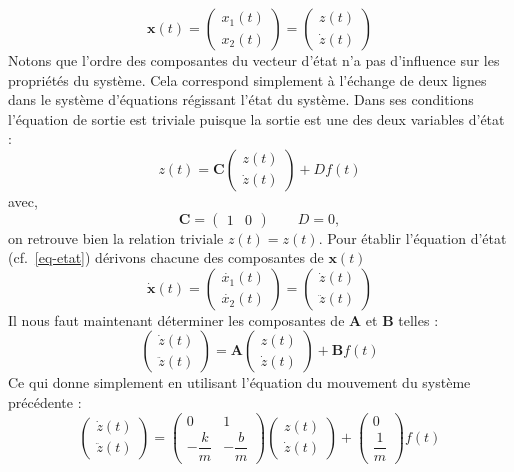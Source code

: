 \[
    \boldsymbol{x}(t)=
    \begin{pmatrix} x_1(t) \\ x_2(t) \end{pmatrix}=
    \begin{pmatrix} z(t) \\ \dot{z}(t) \end{pmatrix}
\]
Notons que l'ordre des composantes du vecteur d'état n'a pas d'influence sur
les propriétés du système. Cela correspond simplement à l'échange de deux lignes
dans le système d'équations régissant l'état du système.
Dans ses conditions l'équation de sortie est triviale puisque la sortie est
une des deux variables d'état :
\[
    z(t)=\boldsymbol{C}\begin{pmatrix} z(t)\\\dot{z}(t)\end{pmatrix} + Df(t)
\]
avec,
\[
    \boldsymbol{C}=\begin{pmatrix} 1 & 0 \end{pmatrix}\quad\quad D=0,
\]
on retrouve bien la relation triviale $z(t)=z(t)$.
\newpage
\restoregeometry
\captionsetup{width=0.9\linewidth}
Pour établir l'équation d'état (cf.~\cref{eq-etat}) dérivons chacune des 
composantes de $\boldsymbol{x}(t)$
\[
    \boldsymbol{\dot{x}}(t)=
    \begin{pmatrix} \dot{x_1}(t) \\ \dot{x_2}(t) \end{pmatrix}=
    \begin{pmatrix} \dot{z}(t) \\ \ddot{z}(t) \end{pmatrix}
\]
Il nous faut maintenant déterminer les composantes de $\boldsymbol{A}$ et 
$\boldsymbol{B}$ telles :
\[
    \begin{pmatrix} \dot{z}(t) \\ \ddot{z}(t) \end{pmatrix}=
    \boldsymbol{A}\begin{pmatrix} z(t) \\ \dot{z}(t) \end{pmatrix} +
    \boldsymbol{B}f(t)
\]
Ce qui donne simplement en utilisant l'équation du mouvement du système 
précédente :
\[
    \begin{pmatrix} \dot{z}(t) \\ \ddot{z}(t) \end{pmatrix}=
    \begin{pmatrix} 
        0 & 1 \\[1em]
        -\dfrac{k}{m} & -\dfrac{b}{m}
    \end{pmatrix} 
    \begin{pmatrix} z(t) \\ \dot{z}(t) \end{pmatrix} +
    \begin{pmatrix} 0 \\[1em] \dfrac{1}{m} \end{pmatrix}f(t)
\]
